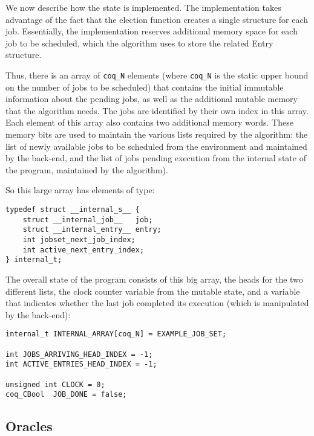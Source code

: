 	We now describe how the state is implemented.
	The implementation takes advantage of the fact that the election function creates a single structure for each job. Essentially, the implementation reserves additional memory space for each job to be scheduled, which the algorithm uses to store the related Entry structure.

	Thus, there is an array of \texttt{coq\_N} elements (where \texttt{coq\_N} is the static upper bound on the number of jobs to be scheduled) that contains the initial immutable information about the pending jobs, as well as the additional mutable memory that the algorithm needs. The jobs are identified by their own index in this array. Each element of this array also contains two additional memory words. These memory bits are used to maintain the various lists required by the algorithm: the list of newly available jobs to be scheduled from the environment and maintained by the back-end, and the list of jobs pending execution from the internal state of the program, maintained by the algorithm).

	So this large array has elements of type:
	\begin{verbatim}
typedef struct __internal_s__ {
    struct __internal_job__   job;
    struct __internal_entry__ entry;
    int jobset_next_job_index;
    int active_next_entry_index;
} internal_t;
	\end{verbatim}

	The overall state of the program consists of this big array, the heads for the two different lists, the clock counter variable from the mutable state, and a variable that indicates whether the last job completed its execution (which is manipulated by the back-end):

	\begin{verbatim}
internal_t INTERNAL_ARRAY[coq_N] = EXAMPLE_JOB_SET;

int JOBS_ARRIVING_HEAD_INDEX = -1;
int ACTIVE_ENTRIES_HEAD_INDEX = -1;

unsigned int CLOCK = 0;
coq_CBool  JOB_DONE = false;
	\end{verbatim}

	\subsection{Oracles}

